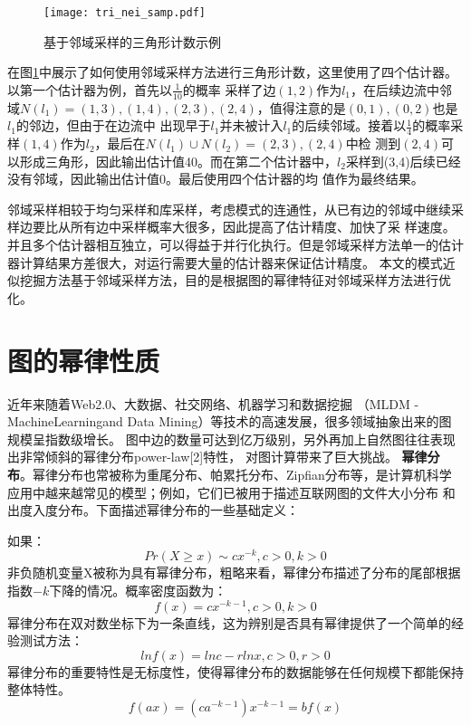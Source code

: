 \documentclass[master]{thesis-uestc}
\begin{document}
\begin{figure}
    \texttt{[image: tri\_nei\_samp.pdf]}
	\caption{基于邻域采样的三角形计数示例}
	\label{fig:tri_nei}
\end{figure}
    在图\ref{fig:tri_nei}中展示了如何使用邻域采样方法进行三角形计数，这里使用了四个估计器。以第一个估计器为例，首先以$\frac{1}{10}$的概率
采样了边$(1,2)$作为$l_1$，在后续边流中邻域$N(l_1)={(1,3),(1,4),(2,3),(2,4)}$，值得注意的是$(0,1),(0,2)$也是$l_1$的邻边，但由于在边流中
出现早于$l_1$并未被计入$l_1$的后续邻域。接着以$\frac{1}{4}$的概率采样$(1,4)$作为$l_2$，最后在$N(l_1) \cup N(l_2) = {(2,3),(2,4)}$中检
测到$(2,4)$可以形成三角形，因此输出估计值40。而在第二个估计器中，$l_2$采样到(3,4)后续已经没有邻域，因此输出估计值0。最后使用四个估计器的均
值作为最终结果。
    
    邻域采样相较于均匀采样和库采样，考虑模式的连通性，从已有边的邻域中继续采样边要比从所有边中采样概率大很多，因此提高了估计精度、加快了采
样速度。并且多个估计器相互独立，可以得益于并行化执行。但是邻域采样方法单一的估计器计算结果方差很大，对运行需要大量的估计器来保证估计精度。
本文的模式近似挖掘方法基于邻域采样方法，目的是根据图的幂律特征对邻域采样方法进行优化。

\section{图的幂律性质}
\label{sec:pow-law-graph}
    近年来随着Web2.0、大数据、社交网络、机器学习和数据挖掘
（MLDM - MachineLearningand Data Mining）等技术的高速发展，很多领域抽象出来的图规模呈指数级增长。
图中边的数量可达到亿万级别，另外再加上自然图往往表现出非常倾斜的幂律分布power-law[2]特性，
对图计算带来了巨大挑战。
    \textbf{幂律分布}。幂律分布也常被称为重尾分布、帕累托分布、Zipfian分布等，是计算机科学应用中越来越常见的模型；例如，它们已被用于描述互联网图的文件大小分布
和出度入度分布。下面描述幂律分布的一些基础定义：

    如果：
\begin{equation*}
    Pr(X \ge x) \sim cx^{-k}, c > 0, k > 0
\end{equation*}
非负随机变量X被称为具有幂律分布，粗略来看，幂律分布描述了分布的尾部根据指数$-k$下降的情况。概率密度函数为：
\begin{equation*}
    f(x) = cx^{-k-1}, c > 0, k > 0
\end{equation*}
幂律分布在双对数坐标下为一条直线，这为辨别是否具有幂律提供了一个简单的经验测试方法：
\begin{equation*}
    lnf(x) = lnc-rlnx, c > 0, r > 0
\end{equation*}
幂律分布的重要特性是无标度性，使得幂律分布的数据能够在任何规模下都能保持整体特性。
\begin{equation*}
    f(ax) = (ca^{-k-1})x^{-k-1}=bf(x)
\end{equation*}
\end{document}
